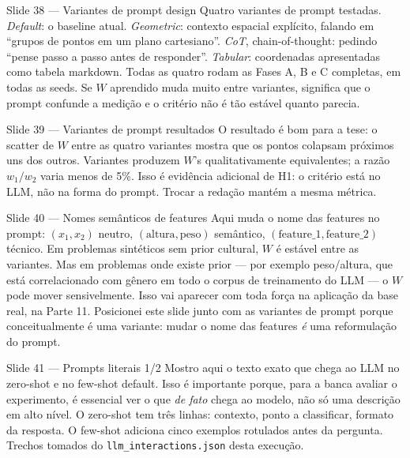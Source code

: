 \documentclass[aspectratio=169,10pt]{beamer}
\begin{document}
\begin{frame}{Slide 38 --- Variantes de prompt design}
\footnotesize
Quatro variantes de prompt testadas. \emph{Default}: o baseline atual. \emph{Geometric}: contexto espacial expl\'icito, falando em ``grupos de pontos em um plano cartesiano''. \emph{CoT}, chain-of-thought: pedindo ``pense passo a passo antes de responder''. \emph{Tabular}: coordenadas apresentadas como tabela markdown. Todas as quatro rodam as Fases A, B e C completas, em todas as seeds. Se $W$ aprendido muda muito entre variantes, significa que o prompt confunde a medi\c{c}\~ao e o crit\'erio n\~ao \'e t\~ao est\'avel quanto parecia.
\end{frame}

\begin{frame}{Slide 39 --- Variantes de prompt resultados}
\footnotesize
O resultado \'e bom para a tese: o scatter de $W$ entre as quatro variantes mostra que os pontos colapsam pr\'oximos uns dos outros. Variantes produzem $W$'s qualitativamente equivalentes; a raz\~ao $w_1/w_2$ varia menos de 5\%. Isso \'e evid\^encia adicional de H1: o crit\'erio est\'a no LLM, n\~ao na forma do prompt. Trocar a reda\c{c}\~ao mant\'em a mesma m\'etrica.
\end{frame}

\begin{frame}{Slide 40 --- Nomes sem\^anticos de features}
\footnotesize
Aqui muda o nome das features no prompt: $(x_1, x_2)$ neutro, $(\text{altura}, \text{peso})$ sem\^antico, $(\text{feature\_1}, \text{feature\_2})$ t\'ecnico. Em problemas sint\'eticos sem prior cultural, $W$ \'e est\'avel entre as variantes. Mas em problemas onde existe prior --- por exemplo peso/altura, que est\'a correlacionado com g\^enero em todo o corpus de treinamento do LLM --- o $W$ pode mover sensivelmente. Isso vai aparecer com toda for\c{c}a na aplica\c{c}\~ao da base real, na Parte 11. Posicionei este slide junto com as variantes de prompt porque conceitualmente \'e uma variante: mudar o nome das features \emph{\'e} uma reformula\c{c}\~ao do prompt.
\end{frame}

\begin{frame}{Slide 41 --- Prompts literais 1/2}
\footnotesize
Mostro aqui o texto exato que chega ao LLM no zero-shot e no few-shot default. Isso \'e importante porque, para a banca avaliar o experimento, \'e essencial ver o que \emph{de fato} chega ao modelo, n\~ao s\'o uma descri\c{c}\~ao em alto n\'ivel. O zero-shot tem tr\^es linhas: contexto, ponto a classificar, formato da resposta. O few-shot adiciona cinco exemplos rotulados antes da pergunta. Trechos tomados do \texttt{llm\_interactions.json} desta execu\c{c}\~ao.
\end{frame}
\end{document}
